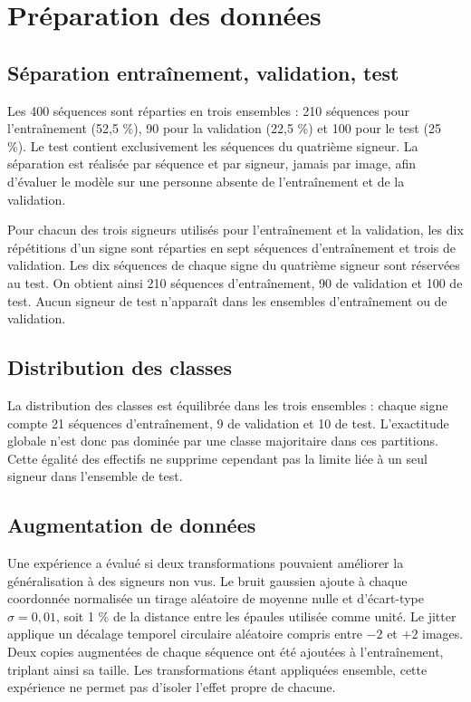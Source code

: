 \section{Préparation des données}

\subsection{Séparation entraînement, validation, test}

Les 400 séquences sont réparties en trois ensembles : 210 séquences pour l'entraînement (52,5 \%), 90 pour la validation (22,5 \%) et 100 pour le test (25 \%). Le test contient exclusivement les séquences du quatrième signeur. La séparation est réalisée par séquence et par signeur, jamais par image, afin d'évaluer le modèle sur une personne absente de l'entraînement et de la validation.

Pour chacun des trois signeurs utilisés pour l'entraînement et la validation, les dix répétitions d'un signe sont réparties en sept séquences d'entraînement et trois de validation. Les dix séquences de chaque signe du quatrième signeur sont réservées au test. On obtient ainsi 210 séquences d'entraînement, 90 de validation et 100 de test. Aucun signeur de test n'apparaît dans les ensembles d'entraînement ou de validation.

\subsection{Distribution des classes}

La distribution des classes est équilibrée dans les trois ensembles : chaque signe compte 21 séquences d'entraînement, 9 de validation et 10 de test. L'exactitude globale n'est donc pas dominée par une classe majoritaire dans ces partitions. Cette égalité des effectifs ne supprime cependant pas la limite liée à un seul signeur dans l'ensemble de test.

\subsection{Augmentation de données}

Une expérience a évalué si deux transformations pouvaient améliorer la généralisation à des signeurs non vus. Le bruit gaussien ajoute à chaque coordonnée normalisée un tirage aléatoire de moyenne nulle et d'écart-type \(\sigma=0{,}01\), soit 1 \% de la distance entre les épaules utilisée comme unité. Le jitter applique un décalage temporel circulaire aléatoire compris entre \(-2\) et \(+2\) images. Deux copies augmentées de chaque séquence ont été ajoutées à l'entraînement, triplant ainsi sa taille. Les transformations étant appliquées ensemble, cette expérience ne permet pas d'isoler l'effet propre de chacune.


